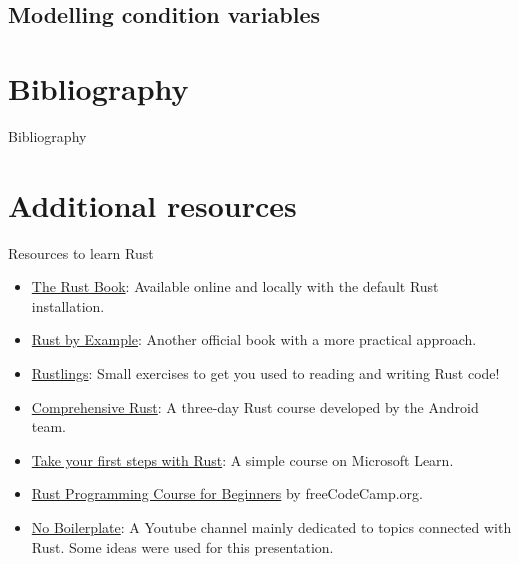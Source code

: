 \documentclass{beamer}
\begin{document}
\subsection{Modelling condition variables}

\section{Bibliography}

\begin{frame}[allowframebreaks]{Bibliography}
  \tiny
  
  
\end{frame}

\section{Additional resources}

\begin{frame}{Resources to learn Rust}
  \begin{itemize}
    \item \href{https://doc.rust-lang.org/stable/book/}{The Rust Book}:
          Available online and locally with the default Rust installation.
    \item \href{https://doc.rust-lang.org/rust-by-example/}{Rust by Example}:
          Another official book with a more practical approach.
    \item \href{https://github.com/rust-lang/rustlings}{Rustlings}:
          Small exercises to get you used to reading and writing Rust code! 
    \item \href{https://google.github.io/comprehensive-rust/}{Comprehensive Rust}:
          A three-day Rust course developed by the Android team.
    \item \href{https://learn.microsoft.com/en-us/training/paths/rust-first-steps/}{Take your first steps with Rust}:
          A simple course on Microsoft Learn.
    \item \href{https://www.youtube.com/watch?v=MsocPEZBd-M}{Rust Programming Course for Beginners} by freeCodeCamp.org.
    \item \href{https://www.youtube.com/\@NoBoilerplate/videos}{No Boilerplate}:
          A Youtube channel mainly dedicated to topics connected with Rust. Some ideas were used for this presentation.
  \end{itemize}
\end{frame}
\end{document}
